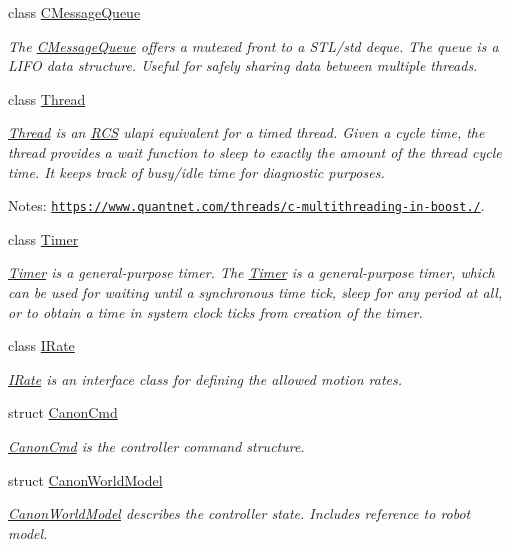 \begin{DoxyCompactItemize}
class \hyperlink{classRCS_1_1CMessageQueue}{C\-Message\-Queue}
\begin{DoxyCompactList}\small\item\em The \hyperlink{classRCS_1_1CMessageQueue}{C\-Message\-Queue} offers a mutexed front to a S\-T\-L/std deque. The queue is a L\-I\-F\-O data structure. Useful for safely sharing data between multiple threads. \end{DoxyCompactList}\item 
class \hyperlink{classRCS_1_1Thread}{Thread}
\begin{DoxyCompactList}\small\item\em \hyperlink{classRCS_1_1Thread}{Thread} is an \hyperlink{namespaceRCS}{R\-C\-S} ulapi equivalent for a timed thread. Given a cycle time, the thread provides a wait function to sleep to exactly the amount of the thread cycle time. It keeps track of busy/idle time for diagnostic purposes. \par
 Notes\-: \href{https://www.quantnet.com/threads/c-multithreading-in-boost.10028/}{\tt https\-://www.\-quantnet.\-com/threads/c-\/multithreading-\/in-\/boost./}. \end{DoxyCompactList}\item 
class \hyperlink{classRCS_1_1Timer}{Timer}
\begin{DoxyCompactList}\small\item\em \hyperlink{classRCS_1_1Timer}{Timer} is a general-\/purpose timer. The \hyperlink{classRCS_1_1Timer}{Timer} is a general-\/purpose timer, which can be used for waiting until a synchronous time tick, sleep for any period at all, or to obtain a time in system clock ticks from creation of the timer. \end{DoxyCompactList}\item 
class \hyperlink{classRCS_1_1IRate}{I\-Rate}
\begin{DoxyCompactList}\small\item\em \hyperlink{classRCS_1_1IRate}{I\-Rate} is an interface class for defining the allowed motion rates. \end{DoxyCompactList}\item 
struct \hyperlink{structRCS_1_1CanonCmd}{Canon\-Cmd}
\begin{DoxyCompactList}\small\item\em \hyperlink{structRCS_1_1CanonCmd}{Canon\-Cmd} is the controller command structure. \end{DoxyCompactList}\item 
struct \hyperlink{structRCS_1_1CanonWorldModel}{Canon\-World\-Model}
\begin{DoxyCompactList}\small\item\em \hyperlink{structRCS_1_1CanonWorldModel}{Canon\-World\-Model} describes the controller state. Includes reference to robot model. \end{DoxyCompactList}\end{DoxyCompactItemize}
